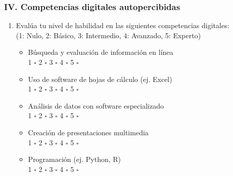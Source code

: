 \documentclass[12pt, a4paper]{article}
\begin{document}
\subsubsection*{IV. Competencias digitales autopercibidas}
\begin{enumerate}[resume, label=\arabic*.]
    \item Evalúa tu nivel de habilidad en las siguientes competencias digitales:\\
    (1: Nulo, 2: Básico, 3: Intermedio, 4: Avanzado, 5: Experto)
    \begin{itemize}
        \item Búsqueda y evaluación de información en línea\\
        \hspace{1em} 1 $\square$ \hspace{1em} 2 $\square$ \hspace{1em} 3 $\square$ \hspace{1em} 4 $\square$ \hspace{1em} 5 $\square$
        \item Uso de software de hojas de cálculo (ej. Excel)\\
        \hspace{1em} 1 $\square$ \hspace{1em} 2 $\square$ \hspace{1em} 3 $\square$ \hspace{1em} 4 $\square$ \hspace{1em} 5 $\square$
        \item Análisis de datos con software especializado\\
        \hspace{1em} 1 $\square$ \hspace{1em} 2 $\square$ \hspace{1em} 3 $\square$ \hspace{1em} 4 $\square$ \hspace{1em} 5 $\square$
        \item Creación de presentaciones multimedia\\
        \hspace{1em} 1 $\square$ \hspace{1em} 2 $\square$ \hspace{1em} 3 $\square$ \hspace{1em} 4 $\square$ \hspace{1em} 5 $\square$
        \item Programación (ej. Python, R)\\
        \hspace{1em} 1 $\square$ \hspace{1em} 2 $\square$ \hspace{1em} 3 $\square$ \hspace{1em} 4 $\square$ \hspace{1em} 5 $\square$
    \end{itemize}
\end{enumerate}
\end{document}
